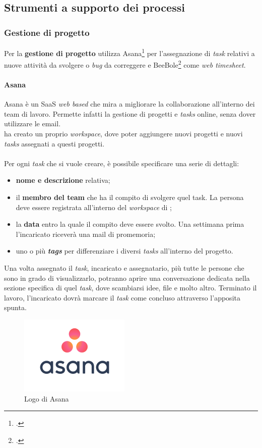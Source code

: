 \subsection{Strumenti a supporto dei processi}
\label{Tecnologie}
\subsubsection{Gestione di progetto}
Per la \textbf{gestione di progetto} \azienda{} utilizza Asana\footcite{asana} per l'assegnazione di \emph{task} relativi a nuove attività da svolgere o \emph{bug} da correggere e BeeBole\footcite{beebole} come \emph{web timesheet}.
\paragraph{Asana}
Asana è un \gls{SaaS} \emph{web based} che mira a migliorare la collaborazione all'interno dei team di lavoro. Permette infatti la gestione di progetti e \emph{tasks} online, senza dover utilizzare le email.\\
\azienda{} ha creato un proprio \emph{workspace}, dove poter aggiungere nuovi progetti e nuovi \emph{tasks} assegnati a questi progetti. \\ \\
Per ogni \emph{task} che si vuole creare, è possibile specificare una serie di dettagli:
\begin{itemize}
	\item \textbf{nome e descrizione} relativa;
	\item il \textbf{membro del team} che ha il compito di svolgere quel task. La persona deve essere registrata all'interno del \emph{workspace} di \azienda;
	\item la \textbf{data} entro la quale il compito deve essere svolto. Una settimana prima l'incaricato riceverà una mail di promemoria;
	\item uno o più \textbf{\emph{tags}} per differenziare i diversi \emph{tasks} all'interno del progetto.
\end{itemize}
Una volta assegnato il \emph{task}, incaricato e assegnatario, più tutte le persone che sono in grado di visualizzarlo, potranno aprire una conversazione dedicata nella sezione specifica di quel \emph{task}, dove scambiarsi idee, file e molto altro. Terminato il lavoro, l'incaricato dovrà marcare il \emph{task} come concluso attraverso l'apposita spunta.
\\ 
\begin{figure}[h]
	\centering
	\includegraphics[scale=0.8]{../Immagini/asana.png}
	\caption{Logo di Asana}
\end{figure}

